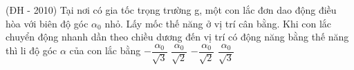 \begin{ex} %
(ĐH - 2010) Tại nơi có gia tốc trọng trường g, một con lắc đơn dao động điều hòa với biên độ góc $\alpha _0$ nhỏ. Lấy mốc thế năng ở vị trí cân bằng. Khi con lắc chuyển động nhanh dần theo chiều dương đến vị trí có động năng bằng thế năng thì li độ góc $\alpha $ của con lắc bằng
\choice
{$-\dfrac{\alpha _0}{\sqrt{3}}$}
{$\dfrac{\alpha _0}{\sqrt{2}}$}
{\True $-\dfrac{\alpha _0}{\sqrt{2}}$}
{$\dfrac{\alpha _0}{\sqrt{3}}$}
\end{ex} 


